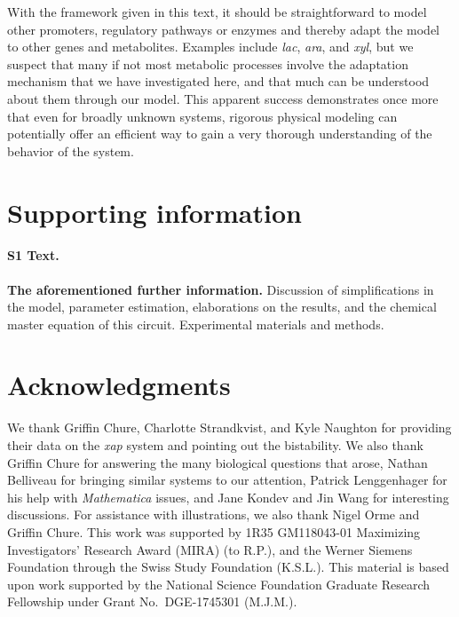 \documentclass[10pt,letterpaper]{article}
\begin{document}
	With the framework given in this text, it
	should be straightforward to model other promoters, regulatory pathways or
	enzymes and thereby adapt the model to other genes and metabolites. Examples
	include \emph{lac}, \emph{ara}, and \emph{xyl}, but we suspect that many if
	not most metabolic processes involve the adaptation mechanism that we have
	investigated here, and that much can be understood about them through our
	model. This apparent success demonstrates once more that even for broadly
	unknown systems, rigorous physical modeling can potentially offer an
	efficient way to gain a very thorough understanding of the behavior of the
	system. 
	
	
	\section*{Supporting information}
	\paragraph*{S1 Text.}
	\label{S1_Text}
	{\bf The aforementioned further information.} Discussion of simplifications
	in the model, parameter estimation, elaborations on the results, and the
	chemical master equation of this circuit. Experimental materials and methods.
	
	\section*{Acknowledgments}
	We thank Griffin Chure, Charlotte Strandkvist, and Kyle Naughton for
	providing their data on the \emph{xap} system and pointing out the
	bistability. We also thank Griffin Chure for answering the many biological
	questions that arose, Nathan Belliveau for bringing similar systems to our
	attention, Patrick Lenggenhager for his help with \emph{Mathematica} issues, and Jane Kondev and Jin Wang for interesting discussions.
	For assistance with illustrations, we also thank Nigel Orme and Griffin Chure.
	This work was supported by 1R35 GM118043-01 Maximizing Investigators'
	Research Award (MIRA) (to R.P.), and the Werner Siemens Foundation
	through the Swiss Study Foundation (K.S.L.). This material is based upon
	work supported by the National Science Foundation Graduate Research
	Fellowship under Grant No.\ DGE-1745301 (M.J.M.).
	
	\nolinenumbers
	
	
\end{document}
